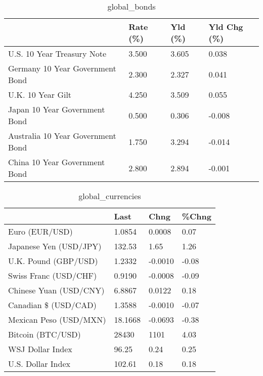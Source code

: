 \documentclass{article}%
\begin{document}
%


\begin{table}[htbp]%
\caption{global\_bonds}%
\centering%
\begin{adjustbox}{width=1\textwidth}%
\begin{tabular}{llll}
\toprule
                                  & Rate (\%) & Yld (\%) & Yld Chg (\%) \\
\midrule
       U.S. 10 Year Treasury Note &    3.500 &   3.605 &       0.038 \\
  Germany 10 Year Government Bond &    2.300 &   2.327 &       0.041 \\
                U.K. 10 Year Gilt &    4.250 &   3.509 &       0.055 \\
    Japan 10 Year Government Bond &    0.500 &   0.306 &      -0.008 \\
Australia 10 Year Government Bond &    1.750 &   3.294 &      -0.014 \\
    China 10 Year Government Bond &    2.800 &   2.894 &      -0.001 \\
\bottomrule
\end{tabular}
%
\end{adjustbox}%
\end{table}

%


\begin{table}[htbp]%
\caption{global\_currencies}%
\centering%
\begin{adjustbox}{width=1\textwidth}%
\begin{tabular}{llll}
\toprule
                       &    Last &    Chng & \%Chng \\
\midrule
        Euro (EUR/USD) &  1.0854 &  0.0008 &  0.07 \\
Japanese Yen (USD/JPY) &  132.53 &    1.65 &  1.26 \\
  U.K. Pound (GBP/USD) &  1.2332 & -0.0010 & -0.08 \\
 Swiss Franc (USD/CHF) &  0.9190 & -0.0008 & -0.09 \\
Chinese Yuan (USD/CNY) &  6.8867 &  0.0122 &  0.18 \\
  Canadian \$ (USD/CAD) &  1.3588 & -0.0010 & -0.07 \\
Mexican Peso (USD/MXN) & 18.1668 & -0.0693 & -0.38 \\
     Bitcoin (BTC/USD) &   28430 &    1101 &  4.03 \\
      WSJ Dollar Index &   96.25 &    0.24 &  0.25 \\
     U.S. Dollar Index &  102.61 &    0.18 &  0.18 \\
\bottomrule
\end{tabular}
%
\end{adjustbox}%
\end{table}
\end{document}
